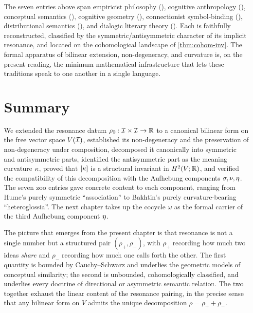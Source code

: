 \bigskip

\noindent The seven entries above span empiricist philosophy
(\cite{Hume1739,Locke1690}), cognitive anthropology
(\cite{Sperber1996,Dawkins1976}), conceptual semantics
(\cite{LakoffJohnson1980,FauconnierTurner2002,Fillmore1982}), cognitive
geometry (\cite{Gardenfors2000}), connectionist symbol-binding
(\cite{Smolensky1990,FodorPylyshyn1988,Plate1995}), distributional
semantics (\cite{Mikolov2013,MikolovKingQueen2013,PenningtonGloVe2014,Vaswani2017}),
and dialogic literary theory (\cite{Bakhtin1981}). Each is faithfully
reconstructed, classified by the symmetric/antisymmetric character of its
implicit resonance, and located on the cohomological landscape of
\cref{thm:cohom-inv}. The formal apparatus of bilinear extension,
non-degeneracy, and curvature is, on the present reading, the minimum
mathematical infrastructure that lets these traditions speak to one
another in a single language.

\section*{Summary}

We extended the resonance datum $\rho_0:\mathcal{I}\times\mathcal{I}\to\mathbb{R}$ to a
canonical bilinear form on the free vector space $V(\mathcal{I})$, established
its non-degeneracy and the preservation of non-degeneracy under
composition, decomposed it canonically into symmetric and antisymmetric
parts, identified the antisymmetric part as the meaning curvature
$\kappa$, proved that $[\kappa]$ is a structural invariant in
$H^2(V;\mathbb{R})$, and verified the compatibility of this decomposition with
the Aufhebung components $\sigma,\nu,\eta$. The seven zoo
entries gave concrete content to each component, ranging from Hume's
purely symmetric ``association'' to Bakhtin's purely curvature-bearing
``heteroglossia''. The next chapter takes up the cocycle $\omega$ as the
formal carrier of the third Aufhebung component $\eta$.

The picture that emerges from the present chapter is that resonance is
not a single number but a structured pair $(\rho_+,\rho_-)$, with
$\rho_+$ recording how much two ideas \emph{share} and $\rho_-$ recording
how much one calls forth the other. The first quantity is bounded by
Cauchy--Schwarz and underlies the geometric models of conceptual
similarity; the second is unbounded, cohomologically classified, and
underlies every doctrine of directional or asymmetric semantic
relation. The two together exhaust the linear content of the resonance
pairing, in the precise sense that any bilinear form on $V$ admits the
unique decomposition $\rho=\rho_++\rho_-$.

